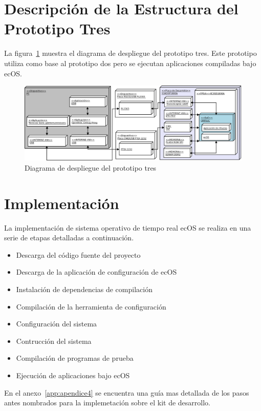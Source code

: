\newpage
		
		\section{Descripción de la Estructura del Prototipo Tres}
		La figura~\ref{fig:ecos} muestra el diagrama de despliegue del prototipo tres. Este prototipo utiliza como base al prototipo dos pero se ejecutan 
		aplicaciones compiladas bajo ecOS.
		
		\begin{figure}[h!]
 		\begin{center}
  		\includegraphics[width=1\textwidth,keepaspectratio=true]{./images/ecos}
  		\caption{Diagrama de despliegue del prototipo tres}
  		\label{fig:ecos} 
 		\end{center}
		\end{figure}
	
		\section{Implementación}	
		
		La implementación de sistema operativo de tiempo real ecOS se realiza en una serie de etapas detalladas a continuación. 
		\begin {itemize}
		\item Descarga del código fuente del proyecto
		\item Descarga de la aplicación de configuración de ecOS
		\item Instalación de dependencias de compilación
		\item Compilación de la herramienta de configuración
		\item Configuración del sistema
		\item Contrucción del sistema 
		\item Compilación de programas de prueba
		\item Ejecución de aplicaciones bajo ecOS
 		\end {itemize}
En el anexo~\ref{app:apendice4} se encuentra una guía mas detallada de los pasos antes nombrados para la implemetación sobre el kit de desarrollo.


